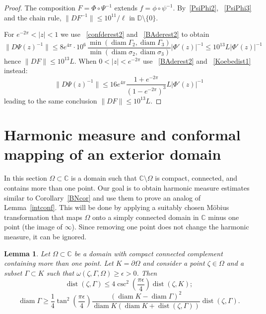 \documentclass[11pt]{amsart}
\newtheorem{lemma}[theorem]{Lemma}
\theoremstyle{remark}
\numberwithin{equation}{section}
\newcommand{\C}{\mathbb{C}}
\newcommand{\DD}{\mathbb{D}}
\newcommand{\abs}[1]{\lvert#1\rvert}
\newcommand{\norm}[1]{\lVert#1\rVert}
\DeclareMathOperator{\dist}{dist}
\DeclareMathOperator{\diam}{diam}
\begin{document}
\begin{proof}
The composition $F = \Phi\circ \Psi^{-1}$ extends $f =\phi\circ \psi^{-1} $. By~\eqref{PsiPhi2}, ~\eqref{PsiPhi3} and the chain rule, $\norm{DF^{-1}}\le 10^{11} / \ell$ in $\DD\setminus\{0\}$.

For $e^{-2\pi}  < \abs{z}<1$ we use ~\eqref{confderest2}  and ~\eqref{BAderest2} to obtain
\begin{equation*}
\norm{D\Psi(z)^{-1}} \le  8e^{4\pi}\cdot 10^6\,\frac{\min(\diam \Gamma_2, \diam \Gamma_3)}{\min(\diam \sigma_2, \diam \sigma_3)} \abs{\Phi'(z)}^{-1} \le 10^{13}L\abs{\Phi'(z)}^{-1}
\end{equation*}
hence $\norm{DF}\le 10^{13}L$. When $0<\abs{z}<e^{-2\pi} $ use ~\eqref{BAderest2} and  ~\eqref{Koebedist1} instead: 
\begin{equation*}
\norm{D\Psi(z)^{-1}} \le  16 e^{4\pi}  \frac{1+e^{-2\pi}}{(1-e^{-2\pi})^3} L \abs{\Phi'(z)}^{-1} 
\end{equation*}
leading to the same conclusion $\norm{DF}\le 10^{13}L$. 
\end{proof}
 
 


\section{Harmonic measure and conformal mapping of an exterior domain}\label{extsec}

In this section $\Omega\subset\C$ is a domain such that $\C\setminus \Omega$ is compact,  connected, and contains more than one point. Our goal  is to obtain harmonic measure estimates similar to Corollary~\ref{BNcor} and use them to prove an analog of Lemma~\ref{intconf}. This will be done by applying a suitably chosen M\"obius transformation that maps $\Omega$ onto a simply connected domain in $\C$ minus one point (the image of $\infty$). Since removing one point does not change the harmonic measure, it can be ignored. 

\begin{lemma}\label{unboundedharm} Let $\Omega\subset \C$ be a domain with compact connected complement  containing more than one point. Let  $K=\partial \Omega$ and consider a point $\zeta \in \Omega$ and a subset $\Gamma\subset K$ such that $\omega(\zeta,\Gamma,\Omega)\ge \epsilon>0$. Then 
\begin{equation}\label{distGamma}
\dist(\zeta,\Gamma) \le 4\csc^2 \left(\frac{\pi \epsilon}{4}\right) \dist(\zeta,K);
\end{equation}
\begin{equation}\label{diamGamma}
\diam \Gamma \ge \frac14 \tan^2 \left(\frac{\pi \epsilon}{4} \right) 
\frac{(\diam K - \diam\Gamma)^2}{\diam K(\diam K+\dist(\zeta, \Gamma))} \dist(\zeta,\Gamma).
\end{equation}
\end{lemma}
\end{document}
